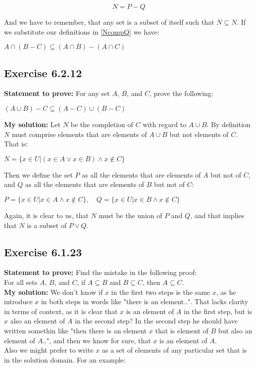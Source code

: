 \documentclass{article}
\newcommand{\cent}[1]{\begin{center}#1\end{center}}
\newcommand{\mat}[2]{\begin{equation} \label{#2}#1\end{equation}}
\newcommand{\In}{\! \in \!}
\newcommand{\Prove}{\textbf{Statement to prove: }}
\newcommand{\Solution}{\textbf{My solution: }}
\newcommand{\QED}{\boxed{}}
\newcommand{\Exercise}[1]{\subsection*{Exercise #1}}
\begin{document}
	\mat{N = P-Q}{NcompQ}
	
	And we have to remember, that any set is a subset of itself such that  $N \subseteq N$. If we substitute our definitions in \eqref{NcompQ} we have:
	\cent{$ A \cap (B-C) \subseteq (A \cap B) - (A \cap C) $}
	
	\QED
	
	\Exercise{6.2.12}
	
	\Prove
	For any set $A$, $B$, and $C$, prove the following:
	
	\cent{$(A \cup B) - C \subseteq (A-C) \cup (B-C)$}
	
	\Solution
	Let $N$ be the completion of $C$ with regard  to $A\cup B$. By definition $N$ must comprise elements that are elements of $A \cup B$ but not elements of $C$. That is:
	
	\cent{$ N = \{x \In U | (x \In A \vee x \In B) \wedge x \notin C\} $}
	
	Then we define the set $P$ as all the elements that are elements of $A$ but not of $C$, and $Q$ as all the elements that are elements of $B$ but not of $C$:
	
	\cent{$P = \{x \In U | x \In A \wedge x \notin C\}, \quad Q = \{x \In U | x \In B \wedge x \notin C\}$}
	
	Again, it is clear to us, that $N$ must be the union of $P$ and $Q$, and that implies that $N$ is a subset of $P \vee Q$.\\
	\QED
	
	\Exercise{6.1.23}
	
	\Prove
	Find the mistake in the following proof:\\
	
	For all sets $A$, $ B $, and $ C $, if $ A \subseteq B $ and $ B \subseteq C $, then $ A \subseteq C $.\\
	
	\Solution
	We don't know if $x$ in the first two steps is the same $x$, as he introduce $x$ in both steps in words like  "there is an element..". That lacks clarity in terms of context, as it is clear that $x$ is an element of  $A$ in the first step, but is $x$ also an element of $A$ in the second step? In the second step he should have written somethin like "then there is an element $ x $ that is element of $ B $ but also an element of $ A $..", and then we know for sure, that $x$ is an element of $A$.\\
	
	Also we might prefer to write $x$ as a set of elements of any particular set that is in the solution domain. For an example:
	
\end{document}
